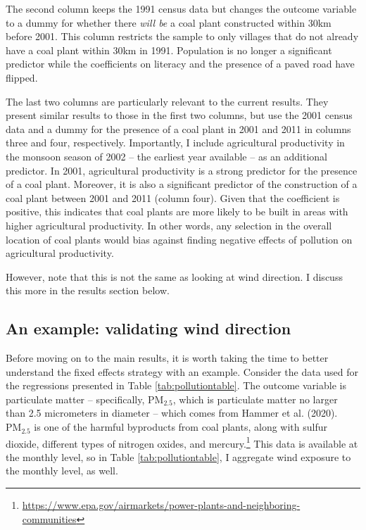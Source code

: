 \documentclass[
]{article}
\begin{document}
The second column keeps the 1991 census data but changes the outcome variable to a dummy for whether there \emph{will be} a coal plant constructed within 30km before 2001. This column restricts the sample to only villages that do not already have a coal plant within 30km in 1991. Population is no longer a significant predictor while the coefficients on literacy and the presence of a paved road have flipped.

The last two columns are particularly relevant to the current results. They present similar results to those in the first two columns, but use the 2001 census data and a dummy for the presence of a coal plant in 2001 and 2011 in columns three and four, respectively. Importantly, I include agricultural productivity in the monsoon season of 2002 -- the earliest year available -- as an additional predictor. In 2001, agricultural productivity is a strong predictor for the presence of a coal plant. Moreover, it is also a significant predictor of the construction of a coal plant between 2001 and 2011 (column four). Given that the coefficient is positive, this indicates that coal plants are more likely to be built in areas with higher agricultural productivity. In other words, any selection in the overall location of coal plants would bias against finding negative effects of pollution on agricultural productivity.

However, note that this is not the same as looking at wind direction. I discuss this more in the results section below.

\hypertarget{an-example-validating-wind-direction}{%
\subsection{\texorpdfstring{An example: validating wind direction \label{validation}}{An example: validating wind direction }}\label{an-example-validating-wind-direction}}

Before moving on to the main results, it is worth taking the time to better understand the fixed effects strategy with an example. Consider the data used for the regressions presented in Table \ref{tab:pollutiontable}. The outcome variable is particulate matter -- specifically, \(\mathrm{PM_{2.5}}\), which is particulate matter no larger than 2.5 micrometers in diameter -- which comes from Hammer et al. (2020). \(\mathrm{PM_{2.5}}\) is one of the harmful byproducts from coal plants, along with sulfur dioxide, different types of nitrogen oxides, and mercury.\footnote{\url{https://www.epa.gov/airmarkets/power-plants-and-neighboring-communities}} This data is available at the monthly level, so in Table \ref{tab:pollutiontable}, I aggregate wind exposure to the monthly level, as well.
\end{document}
